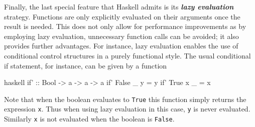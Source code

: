 \documentclass[a4paper,12pt, DIV=14, BCOR=5mm, twoside, headsepline, numbers=noenddot]{scrbook}
\begin{document}
Finally, the last special feature that Haskell admits is its \textit{\textbf{lazy evaluation}} strategy. Functions are only explicitly evaluated on their arguments once the result is needed. This does not only allow for performance improvements as by employing lazy evaluation, unnecessary function calls can be avoided; it also provides further advantages. For instance, lazy evaluation enables the use of conditional control structures in a purely functional style. The usual conditional if statement, for instance, can be given by a function
\begin{center}
\begin{cminted}{haskell}
if' :: Bool -> a -> a -> a
if' False _ y = y 
if' True x _ = x 
\end{cminted}
\end{center}
Note that when the boolean evaluates to \texttt{True} this function simply returns the expression \texttt{x}. Thus when using lazy evaluation in this case, \texttt{y} is never evaluated. Similarly \texttt{x} is not evaluated when the boolean is \texttt{False}. 
\end{document}

